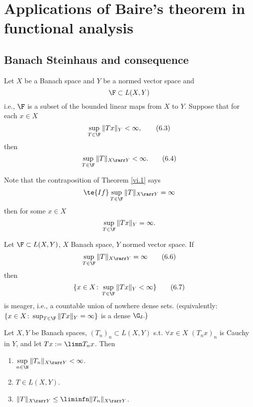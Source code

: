 \section{Applications of Baire's theorem in functional analysis}
\subsection{Banach Steinhaus and consequence}

\begin{thm}\label{vi.1}
    Let $X$ be a Banach space and $Y$ be a normed vector space and 
    \[\F\subset L(X,Y)\]
    i.e., $\F$ is a subset of the bounded linear maps from $X$ to $Y$. Suppose that for each $x\in X$
    \[\sup_{T\in\F}\|Tx\|_Y<\infty,\tag{6.3}\label{6.3}\]
    then
    \[\sup_{T\in\F}\|T\|_{X\rarr Y}<\infty.\tag{6.4}\label{6.4}\]
\end{thm}
Note that the contraposition of Theorem \ref{vi.1} says
\[\te{If }\sup_{T\in\F}\|T\|_{X\rarr Y}=\infty\]
then for some $x\in X$
\[\sup_{T\in\F}\|Tx\|_Y=\infty.\]

\begin{thm}\label{vi.2}
    Let $\F\subset L(X,Y)$, $X$ Banach space, $Y$ normed vector space. If
    \[\sup_{T\in\F}\|T\|_{X\rarr Y}=\infty\tag{6.6}\label{6.6}\]
    then
    \[\{x\in X\colon\sup_{T\in\F}\|Tx\|_Y<\infty\}\tag{6.7}\label{6.7}\]
    is meager, i.e., a countable union of nowhere dense sets.
    $\big($equivalently: $\{x\in X\colon\sup_{T\in\F}\|Tx\|_Y=\infty\}$ is a dense $\G_\delta.\big)$
\end{thm}

\begin{cor}\label{vi.3}
    Let $X,Y$ be Banach spaces, $(T_n)_n\subset L(X,Y)$ s.t. $\forall x\in X$ $(T_nx)_n$ is Cauchy in $Y$, and let $Tx:=\limn T_nx$. Then
    \begin{enumerate}[label=\alph*)]
        \item $\sup\limits_{n\in\N}\|T_n\|_{X\rarr Y}<\infty$.\label{vi.3.a}
        \item $T\in L(X,Y)$.\label{vi.3.b}
        \item $\|T\|_{X\rarr Y}\leq\liminfn\|T_n\|_{X\rarr Y}$.\label{vi.3.c}
    \end{enumerate}
\end{cor}

